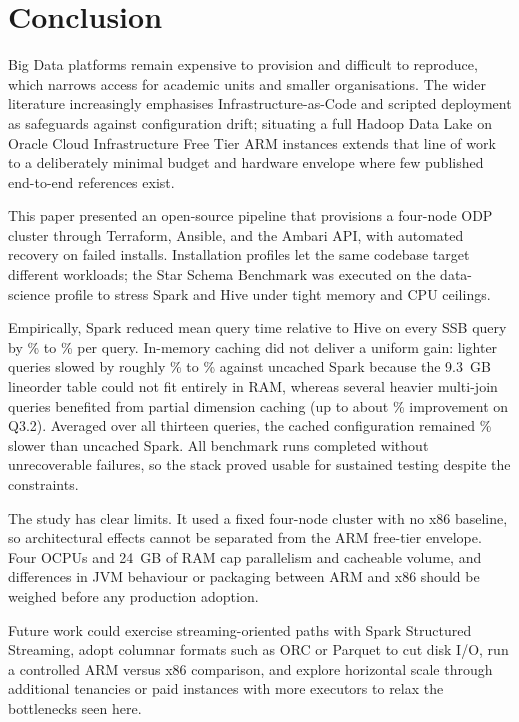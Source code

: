 \section{Conclusion}
\label{sec:conclusion}

Big Data platforms remain expensive to provision and difficult to reproduce,
which narrows access for academic units and smaller organisations. The wider
literature increasingly emphasises Infrastructure-as-Code and scripted
deployment as safeguards against configuration drift; situating a full Hadoop
Data Lake on Oracle Cloud Infrastructure Free Tier ARM instances extends that
line of work to a deliberately minimal budget and hardware envelope where few
published end-to-end references exist.

This paper presented an open-source pipeline that provisions a four-node ODP
cluster through Terraform, Ansible, and the Ambari API, with automated recovery
on failed installs. Installation profiles let the same codebase target
different workloads; the Star Schema Benchmark was executed on the
data-science profile to stress Spark and Hive under tight memory and
CPU ceilings.

Empirically, Spark reduced mean query time relative to Hive on every SSB query
by \PaperHSRedPctMin\% to \PaperHSRedPctMax\% per query. In-memory caching did
not deliver a uniform gain: lighter queries slowed by roughly
\PaperCacheOverheadNarrativeMinPct\% to \PaperCacheOverheadNarrativeMaxPct\%
against uncached Spark because the 9.3~GB lineorder table could not
fit entirely in RAM, whereas several heavier multi-join queries benefited from
partial dimension caching (up to about \PaperQThreeTwoCacheImprovementPct\%
improvement on Q3.2). Averaged over all thirteen queries, the cached
configuration remained \PaperCacheVsSparkMeanPenaltyPct\% slower than uncached
Spark. All benchmark runs completed without unrecoverable failures,
so the stack proved usable for sustained testing despite the constraints.

The study has clear limits. It used a fixed four-node cluster with no x86
baseline, so architectural effects cannot be separated from the ARM
free-tier envelope. Four OCPUs and 24~GB of RAM cap parallelism and cacheable volume,
and differences in JVM behaviour or packaging between ARM and x86 should be
weighed before any production adoption.

Future work could exercise streaming-oriented paths with Spark Structured Streaming, adopt
columnar formats such as ORC or Parquet to cut disk I/O, run a controlled ARM
versus x86 comparison, and explore horizontal scale through additional
tenancies or paid instances with more executors to relax the bottlenecks seen
here.
